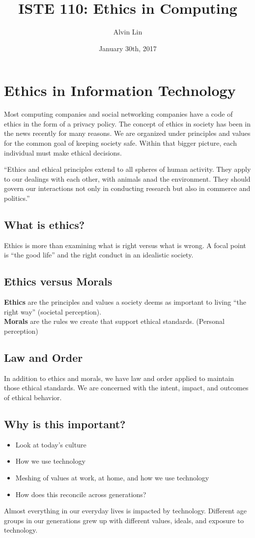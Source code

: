 \documentclass[letterpaper, 12pt]{article}
\title{ISTE 110: Ethics in Computing}
\author{Alvin Lin}
\date{January 30th, 2017}
\begin{document}
\maketitle

\section*{Ethics in Information Technology}
Most computing companies and social networking companies have a code of ethics
in the form of a privacy policy. The concept of ethics in society has been
in the news recently for many reasons. We are organized under principles and
values for the common goal of keeping society safe. Within that bigger picture,
each individual must make ethical decisions. \par
``Ethics and ethical principles extend to all spheres of human activity. They
apply to our dealings with each other, with animals anad the environment. They
should govern our interactions not only in conducting research but also in
commerce and politics.''

\subsection*{What is ethics?}
Ethics is more than examining what is right versus what is wrong. A focal point
is ``the good life'' and the right conduct in an idealistic society.

\subsection*{Ethics versus Morals}
\textbf{Ethics} are the principles and values a society deems as important to
living ``the right way'' (societal perception). \\
\textbf{Morals} are the rules we create that support ethical standards.
(Personal perception)

\subsection*{Law and Order}
In addition to ethics and morals, we have law and order applied to maintain
those ethical standards. We are concerned with the intent, impact, and outcomes
of ethical behavior.

\subsection*{Why is this important?}
\begin{itemize}
  \item Look at today's culture
  \item How we use technology
  \item Meshing of values at work, at home, and how we use technology
  \item How does this reconcile across generations?
\end{itemize}
Almost everything in our everyday lives is impacted by technology. Different
age groups in our generations grew up with different values, ideals, and
exposure to technology.
\end{document}
